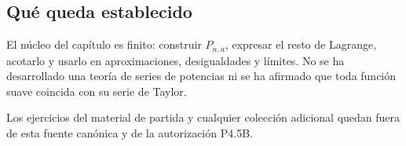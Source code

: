 \subsection{Qué queda establecido}

El núcleo del capítulo es finito: construir \(P_{n,a}\), expresar el resto de
Lagrange, acotarlo y usarlo en aproximaciones, desigualdades y límites. No se
ha desarrollado una teoría de series de potencias ni se ha afirmado que toda
función suave coincida con su serie de Taylor.

Los ejercicios del material de partida y cualquier colección adicional
quedan fuera de esta fuente canónica y de la autorización P4.5B.
